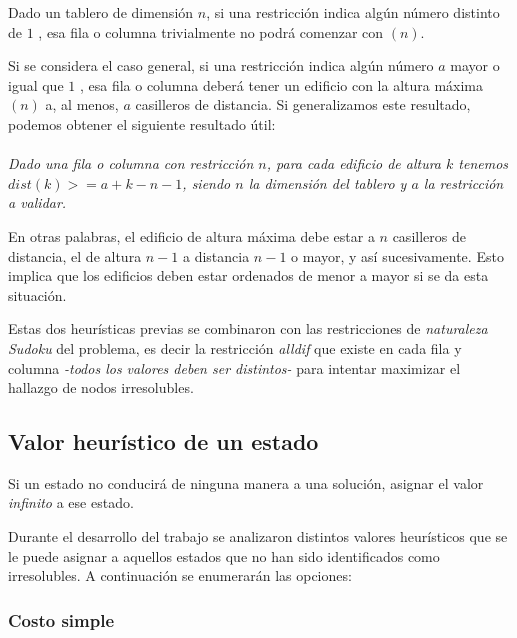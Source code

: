 \documentclass[%
    final,
    reprint,
    notitlepage,
    narroweqnarray,
    inline,
    twoside,
    invited
    ]{ieee}
\begin{document}
\par Dado un tablero de dimensión $n$, si una restricción indica algún número distinto de $1$ , esa fila o columna trivialmente no podrá comenzar con $(n)$.\\
\par Si se considera el caso general, si una restricción indica algún número $a$ mayor o igual que $1$ , esa fila o columna deberá tener un edificio con la altura máxima $(n)$ a, al menos, $a$ casilleros de distancia.  Si generalizamos este resultado, podemos obtener el siguiente resultado útil:\\\\
\emph{Dado una fila o columna con restricción $n$, para cada edificio de altura $k$ tenemos $dist(k) >= a + k - n - 1 $, siendo $n$ la dimensión del tablero y $a$ la restricción a validar.}\\
\par En otras palabras, el edificio de altura máxima debe estar a $n$ casilleros de distancia, el de altura $n-1$ a distancia $n-1$ o mayor, y así sucesivamente. Esto implica que los edificios deben estar ordenados de menor a mayor si se da esta situación.\\

\par Estas dos heurísticas previas se combinaron con las restricciones de  \textit{naturaleza Sudoku} del problema, es decir la restricción \textit{alldif} que existe en cada fila y columna \textit{-todos los valores deben ser distintos-} para intentar maximizar el hallazgo de nodos irresolubles.\\

\subsection{Valor heurístico de un estado}

\par Si un estado no conducirá de ninguna manera a una solución, asignar el valor \textit{infinito} a ese estado. 
\par Durante el desarrollo del trabajo se analizaron distintos valores heurísticos que se le puede asignar a aquellos estados que no han sido 
identificados como irresolubles. A continuación se enumerarán las opciones:

\subsubsection{Costo simple}
\end{document}
